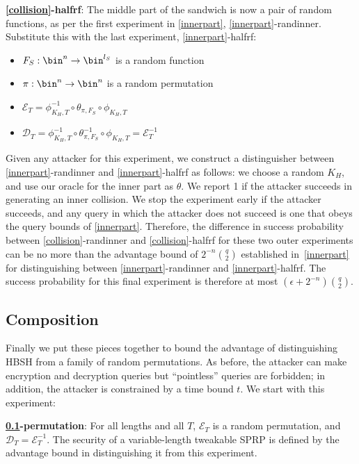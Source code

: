 \documentclass[journal=tosc,preprint,floatrow,submission]{iacrtrans}
\newcommand*{\xprm}[2]{\textsf{\ref*{#1}-#2}}
\newcommand*{\xprmtitle}[2]{\textbf{\xprm{#1}{#2}}}
\newcommand*{\calE}{\mathcal{E}}
\newcommand*{\calD}{\mathcal{D}}
\begin{document}
\xprmtitle{collision}{halfrf}: The middle part of the sandwich is now a pair of random functions,
as per the first experiment in \autoref{innerpart}, \xprm{innerpart}{randinner}.
Substitute this with the last experiment, \xprm{innerpart}{halfrf}:

\begin{itemize}
    \item $F_S: \bin^n \rightarrow \bin^{l_S}$ is a random function
    \item $\pi: \bin^n \rightarrow \bin^n$ is a random permutation
    \item $\calE_T = \phi^{-1}_{K_H, T} \circ \theta_{\pi, F_S} \circ \phi_{K_H, T}$
    \item $\calD_T = \phi^{-1}_{K_H, T} \circ \theta_{\pi, F_S}^{-1} \circ \phi_{K_H, T} = \calE_T^{-1}$
\end{itemize}

Given any attacker for this experiment,
we construct a distinguisher between \xprm{innerpart}{randinner} and \xprm{innerpart}{halfrf} as
follows: we choose a random $K_H$, and use our oracle for the inner part as $\theta$.
We report 1 if the attacker succeeds in generating an inner collision.
We stop the experiment early if the attacker succeeds, and any query in which the attacker
does not succeed is one that obeys the query bounds of \autoref{innerpart}.
Therefore, the difference in success probability
between \xprm{collision}{randinner} and \xprm{collision}{halfrf}
for these two outer experiments can be no more than
the advantage bound of $2^{-n}\binom{q}{2}$
established in~\autoref{innerpart} for distinguishing between
\xprm{innerpart}{randinner} and \xprm{innerpart}{halfrf}.
The success
probability for this final experiment is therefore at most
$(\epsilon + 2^{-n})\binom{q}{2}$.

\subsection{Composition}\label{composition}

Finally we put these pieces together to bound the advantage of distinguishing HBSH from
a family of random permutations. As before, the attacker can make encryption and decryption queries
but ``pointless'' queries are forbidden; in addition, the attacker is constrained by a time
bound $t$. We start with this experiment:

\xprmtitle{composition}{permutation}: For all lengths and all $T$, $\calE_T$ is a random permutation,
and $\calD_T = \calE_T^{-1}$. The security of a variable-length tweakable SPRP is defined by
the advantage bound in distinguishing it from this experiment.
\end{document}
